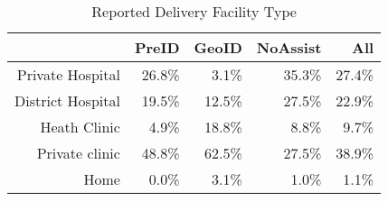 \begin{table}[ht]
\centering
\begin{tabular}{rrrrr}
  \hline
 & PreID & GeoID & NoAssist & All \\ 
  \hline
Private Hospital & 26.8\% & 3.1\% & 35.3\% & 27.4\% \\ 
  District Hospital & 19.5\% & 12.5\% & 27.5\% & 22.9\% \\ 
  Heath Clinic & 4.9\% & 18.8\% & 8.8\% & 9.7\% \\ 
  Private clinic & 48.8\% & 62.5\% & 27.5\% & 38.9\% \\ 
  Home & 0.0\% & 3.1\% & 1.0\% & 1.1\% \\ 
   \hline
\end{tabular}
\caption{Reported Delivery Facility Type} 
\end{table}
